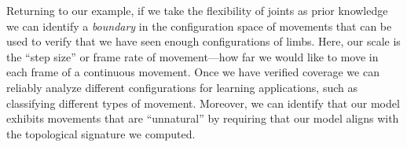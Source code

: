 
Returning to our example, if we take the flexibility of joints as prior knowledge we can identify a \emph{boundary} in the configuration space of movements that can be used to verify that we have seen enough configurations of limbs.
Here, our scale is the ``step size'' or frame rate of movement---how far we would like to move in each frame of a continuous movement.
Once we have verified coverage we can reliably analyze different configurations for learning applications, such as classifying different types of movement.
Moreover, we can identify that our model exhibits movements that are ``unnatural'' by requiring that our model aligns with the topological signature we computed.

